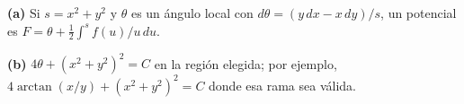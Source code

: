 \noindent\textbf{(a)} Si $s=x^2+y^2$ y $\theta$ es un ángulo local con $d\theta=(y\,dx-x\,dy)/s$, un potencial es $F=\theta+\tfrac12\int^s f(u)/u\,du$.

\noindent\textbf{(b)} $4\theta+(x^2+y^2)^2=C$ en la región elegida; por ejemplo, $4\arctan(x/y)+(x^2+y^2)^2=C$ donde esa rama sea válida.
